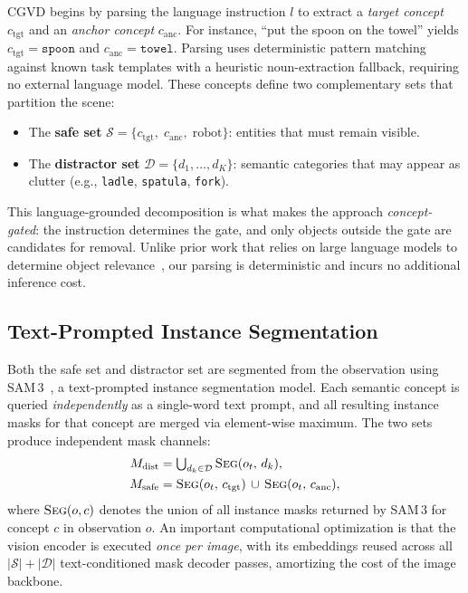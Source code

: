 CGVD begins by parsing the language instruction $l$ to extract a \emph{target concept} $c_{\text{tgt}}$ and an \emph{anchor concept} $c_{\text{anc}}$. For instance, ``put the spoon on the towel'' yields $c_{\text{tgt}} = \texttt{spoon}$ and $c_{\text{anc}} = \texttt{towel}$. Parsing uses deterministic pattern matching against known task templates with a heuristic noun-extraction fallback, requiring no external language model. These concepts define two complementary sets that partition the scene:
\begin{itemize}
    \item The \textbf{safe set} $\mathcal{S} = \{c_{\text{tgt}},\; c_{\text{anc}},\; \text{robot}\}$: entities that must remain visible.
    \item The \textbf{distractor set} $\mathcal{D} = \{d_1, \ldots, d_K\}$: semantic categories that may appear as clutter (e.g., \texttt{ladle}, \texttt{spatula}, \texttt{fork}).
\end{itemize}

This language-grounded decomposition is what makes the approach \emph{concept-gated}: the instruction determines the gate, and only objects outside the gate are candidates for removal. Unlike prior work that relies on large language models to determine object relevance~\cite{byovla}, our parsing is deterministic and incurs no additional inference cost.

\subsection{Text-Prompted Instance Segmentation}
\label{sec:segmentation}

Both the safe set and distractor set are segmented from the observation using SAM\,3~\cite{sam3}, a text-prompted instance segmentation model. Each semantic concept is queried \emph{independently} as a single-word text prompt, and all resulting instance masks for that concept are merged via element-wise maximum. The two sets produce independent mask channels:
\begin{align}
    M_{\text{dist}} &= \textstyle\bigcup_{d_k \in \mathcal{D}} \textsc{Seg}(o_t,\, d_k), \label{eq:distractor_mask} \\
    M_{\text{safe}} &= \textsc{Seg}(o_t,\, c_{\text{tgt}}) \,\cup\, \textsc{Seg}(o_t,\, c_{\text{anc}}), \label{eq:safe_mask}
\end{align}
where $\textsc{Seg}(o, c)$ denotes the union of all instance masks returned by SAM\,3 for concept $c$ in observation $o$. An important computational optimization is that the vision encoder is executed \emph{once per image}, with its embeddings reused across all $|\mathcal{S}| + |\mathcal{D}|$ text-conditioned mask decoder passes, amortizing the cost of the image backbone.


